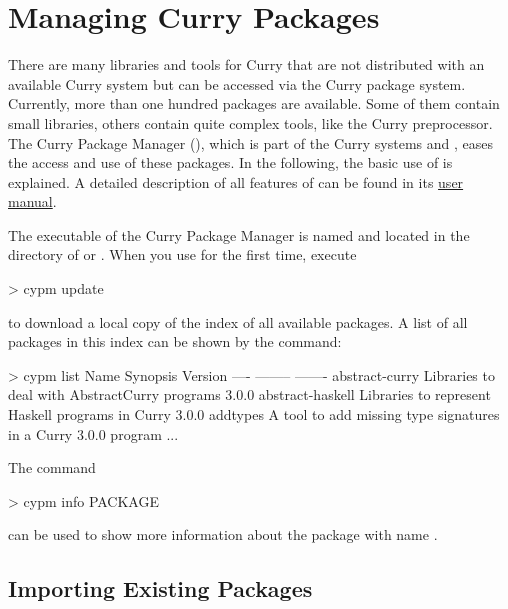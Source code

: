 \chapter{Managing Curry Packages}

There are many libraries and tools for Curry
that are not distributed with an available Curry system
but can be accessed via the Curry package system.
Currently, more than one hundred packages are
available.
Some of them contain small libraries, others
contain quite complex tools, like the Curry preprocessor.
The Curry Package Manager (\cpm),
which is part of the Curry systems \pakcs and \kics,
eases the access and use of these packages.
In the following, the basic use of \cpm is explained.
A detailed description of all features of \cpm
can be found in its
\href{http://curry-lang.org/tools/cpm}{user manual}.

The executable of the Curry Package Manager is named 
and located in the  directory of \pakcs or \kics.
When you use \cpm for the first time, execute
%
\begin{curry}
> cypm update
\end{curry}
%
to download a local copy of the index of all available packages.
A list of all packages in this index can be shown by
the  command:
%
\begin{curry}
> cypm list
Name             Synopsis                                         Version   
----             --------                                         -------   
abstract-curry   Libraries to deal with AbstractCurry programs     3.0.0     
abstract-haskell Libraries to represent Haskell programs in Curry  3.0.0     
addtypes         A tool to add missing type signatures in a Curry  3.0.0     
                 program                                           
...
\end{curry}
%
The command
%
\begin{curry}
> cypm info PACKAGE
\end{curry}
%
can be used to show more information about the package with name
.

\section{Importing Existing Packages}
\label{sec:importing-packages}

